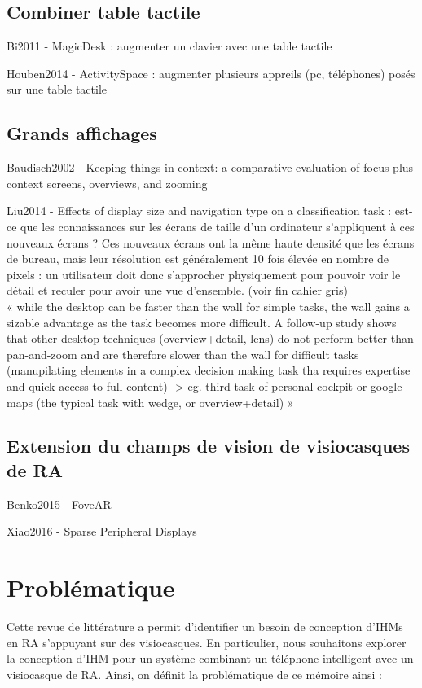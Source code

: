 \subsection{Combiner table tactile}
Bi2011 - MagicDesk : augmenter un clavier avec une table tactile

Houben2014 - ActivitySpace : augmenter plusieurs appreils (pc, téléphones) posés sur une table tactile

\subsection{Grands affichages}
Baudisch2002 - Keeping things in context: a comparative evaluation of focus plus context screens, overviews, and zooming

Liu2014 - Effects of display size and navigation type on a classification task : est-ce que les connaissances sur les écrans de taille d'un ordinateur s'appliquent à ces nouveaux écrans ? Ces nouveaux écrans ont la même haute densité que les écrans de bureau, mais leur résolution est généralement 10 fois élevée en nombre de pixels : un utilisateur doit donc s'approcher physiquement pour pouvoir voir le détail et reculer pour avoir une vue d'ensemble. (voir fin cahier gris)\\
« while the desktop can be faster than the wall for simple tasks, the wall gains a sizable advantage as the task becomes more difficult. A follow-up study shows that other desktop techniques (overview+detail, lens) do not perform better than pan-and-zoom and are therefore slower than the wall for difficult tasks (manupilating elements in a complex decision making task tha requires expertise and quick access to full content) -> eg. third task of personal cockpit or google maps (the typical task with wedge, or overview+detail) »

\subsection{Extension du champs de vision de visiocasques de RA}
Benko2015 - FoveAR

Xiao2016 - Sparse Peripheral Displays


\section{Problématique}
Cette revue de littérature a permit d'identifier un besoin de conception d'IHMs en RA s'appuyant sur des visiocasques. En particulier, nous souhaitons explorer la conception d'IHM pour un système combinant un téléphone intelligent avec un visiocasque de RA. Ainsi, on définit la problématique de ce mémoire ainsi :

